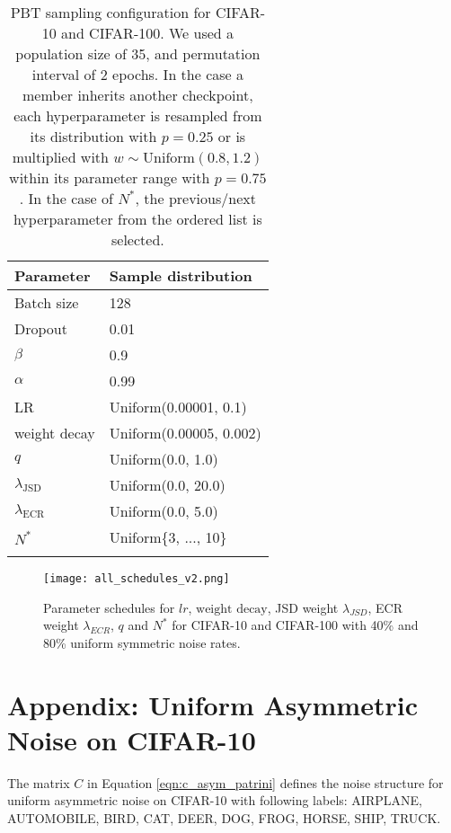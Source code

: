 \documentclass{article}
\DeclareMathOperator{\ECR}{ECR}
\DeclareMathOperator{\JSD}{JSD}
\begin{document}
\begin{table}
\centering
\caption{PBT sampling configuration for CIFAR-10 and CIFAR-100. We used a population size of 35, and permutation interval of 2 epochs. In the case a member inherits another checkpoint, each hyperparameter is resampled from its distribution with $p=0.25$ or is multiplied with $w \sim \text{Uniform}(0.8,1.2)$ within its parameter range with $p=0.75$. In the case of $N^*$, the previous/next hyperparameter from the ordered list is selected.}
\begin{tabular}{ll}
\toprule
Parameter    & Sample distribution \\
\midrule
Batch size        & 128                    \\
Dropout           & 0.01                    \\
$\beta$             & 0.9                    \\
$\alpha$            & 0.99                    \\
LR                & Uniform(0.00001, 0.1)                     \\
weight decay      & Uniform(0.00005, 0.002)                    \\
$q$               & Uniform(0.0, 1.0)                 \\
$\lambda_{\JSD}$    & Uniform(0.0, 20.0)                    \\
$\lambda_{\ECR}$    & Uniform(0.0, 5.0)                    \\
$N^*$             & Uniform\{3, ..., 10\}  \\
\bottomrule
\label{table_pbtconfiguration}
\end{tabular}
\end{table}

\begin{figure*}[h]
  \centering
  \texttt{[image: all\_schedules\_v2.png]}
  \caption{Parameter schedules for $lr$, $\text{weight decay}$, JSD weight $\lambda_{JSD}$, ECR weight $\lambda_{ECR}$, $q$ and $N^*$ for CIFAR-10 and CIFAR-100 with 40\% and 80\% uniform symmetric noise rates.}
  \label{pbt_all_schedules}
\end{figure*}



\section{Appendix: Uniform Asymmetric Noise on CIFAR-10}
\label{appendix:asym}

The matrix $C$ in Equation \ref{eqn:c_asym_patrini} defines the noise structure for uniform asymmetric noise on CIFAR-10 with following labels: AIRPLANE, AUTOMOBILE, BIRD, CAT, DEER, DOG, FROG, HORSE, SHIP, TRUCK.
\end{document}
